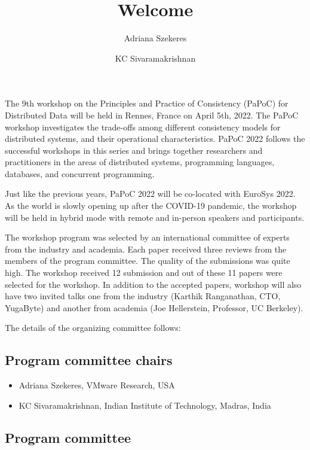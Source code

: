 \documentclass[screen,11pt]{acmart}
\begin{document}
\title{Welcome}
\author{Adriana Szekeres}
\author{KC Sivaramakrishnan}
\maketitle
\vspace{-0.5cm}

The 9th workshop on the Principles and Practice of Consistency (PaPoC) for
Distributed Data will be held in Rennes, France on April 5th, 2022. The PaPoC
workshop investigates the trade-offs among different consistency models for
distributed systems, and their operational characteristics. PaPoC 2022 follows
the successful workshops in this series and brings together researchers and
practitioners in the areas of distributed systems, programming languages,
databases, and concurrent programming.

Just like the previous years, PaPoC 2022 will be co-located with EuroSys 2022.
As the world is slowly opening up after the COVID-19 pandemic, the workshop
will be held in hybrid mode with remote and in-person speakers and
participants.

The workshop program was selected by an international committee of experts from
the industry and academia. Each paper received three reviews from the members
of the program committee. The quality of the submissions was quite high. The
workshop received 12 submission and out of these 11 papers were selected for
the workshop. In addition to the accepted papers, workshop will also have two
invited talks one from the industry (Karthik Ranganathan, CTO, YugaByte) and
another from academia (Joe Hellerstein, Professor, UC Berkeley).

The details of the organizing committee follows:

\subsection*{Program committee chairs}

\begin{itemize}
\item Adriana Szekeres, VMware Research, USA
\item KC Sivaramakrishnan, Indian Institute of Technology, Madras, India
\end{itemize}

\subsection*{Program committee}
\end{document}
